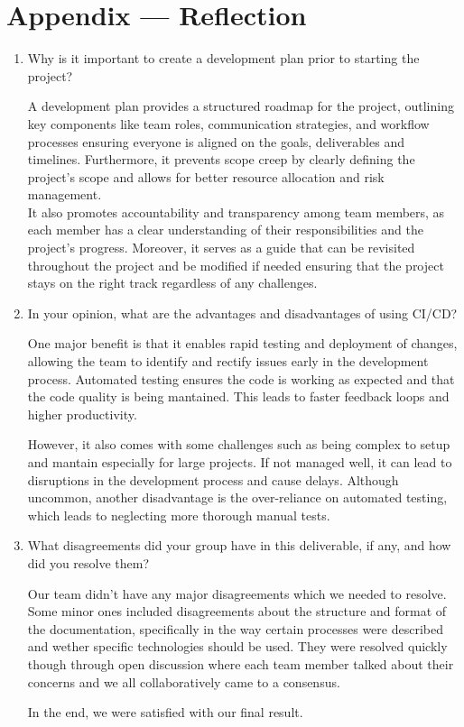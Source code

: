 \documentclass{article}
\begin{document}
\newpage{}

\section*{Appendix --- Reflection}

\begin{enumerate}
    \item Why is it important to create a development plan prior to starting the
    project?

    A development plan provides a structured roadmap for the project, outlining key 
    components like team roles, communication strategies, and workflow processes ensuring
    everyone is aligned on the goals, deliverables and timelines. Furthermore, it
    prevents scope creep by clearly defining the project's scope and allows for better 
    resource allocation and risk management. \\

    It also promotes accountability and transparency among team members, as each member
    has a clear understanding of their responsibilities and the project's progress. Moreover, 
    it serves as a guide that can be revisited throughout the project and be modified if needed 
    ensuring that the project stays on the right track regardless of any challenges.

    \item In your opinion, what are the advantages and disadvantages of using
    CI/CD?

    One major benefit is that it enables rapid testing and deployment of changes, allowing
    the team to identify and rectify issues early in the development process. Automated testing
    ensures the code is working as expected and that the code quality is being mantained. This leads 
    to faster feedback loops and higher productivity.

    However, it also comes with some challenges such as being complex to setup and mantain 
    especially for large projects. If not managed well, it can lead to disruptions in the 
    development process and cause delays. Although uncommon, another disadvantage is the over-reliance 
    on automated testing, which leads to neglecting more thorough manual tests.

    \item What disagreements did your group have in this deliverable, if any,
    and how did you resolve them?

    Our team didn't have any major disagreements which we needed to resolve. Some minor ones included 
    disagreements about the structure and format of the documentation, specifically in the way certain processes
    were described and wether specific technologies should be used. They were resolved quickly though through open discussion
    where each team member talked about their concerns and we all collaboratively came to a consensus.

    In the end, we were satisfied with our final result.
\end{enumerate}
\end{document}
